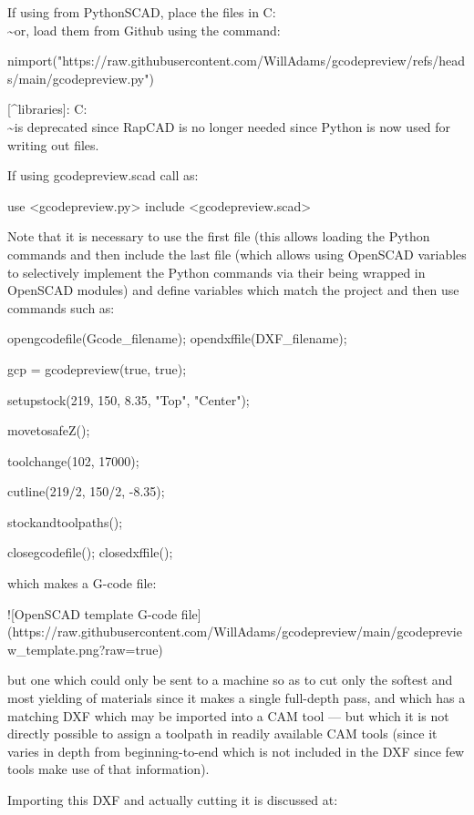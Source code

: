 \documentclass{ltxdoc}
\begin{document}
\begin{readme}
If using from PythonSCAD, place the files in C:\Users\\\~\Documents\OpenSCAD\libraries [^libraries] or, load them from Github using the command:

    nimport("https://raw.githubusercontent.com/WillAdams/gcodepreview/refs/heads/main/gcodepreview.py")

[^libraries]: C:\Users\\\~\Documents\RapCAD\libraries is deprecated since RapCAD is no longer needed since Python is now used for writing out files.

If using gcodepreview.scad call as:

    use <gcodepreview.py>
    include <gcodepreview.scad>

Note that it is necessary to use the first file (this allows loading the Python commands and then include the last file (which allows using OpenSCAD variables to selectively implement the Python commands via their being wrapped in OpenSCAD modules) and define variables which match the project and then use commands such as:

    opengcodefile(Gcode_filename);
    opendxffile(DXF_filename);
    
    gcp = gcodepreview(true, true);

    setupstock(219, 150, 8.35, "Top", "Center");
    
    movetosafeZ();
    
    toolchange(102, 17000);
    
    cutline(219/2, 150/2, -8.35);

    stockandtoolpaths();
    
    closegcodefile();
    closedxffile();

which makes a G-code file:

![OpenSCAD template G-code file](https://raw.githubusercontent.com/WillAdams/gcodepreview/main/gcodepreview_template.png?raw=true)

but one which could only be sent to a machine so as to cut only the softest and most yielding of materials since it makes a single full-depth pass, and which has a matching DXF which may be imported into a CAM tool --- but which it is not directly possible to assign a toolpath in readily available CAM tools (since it varies in depth from beginning-to-end which is not included in the DXF since few tools make use of that information). 

Importing this DXF and actually cutting it is discussed at:


\end{readme}
\end{document}
